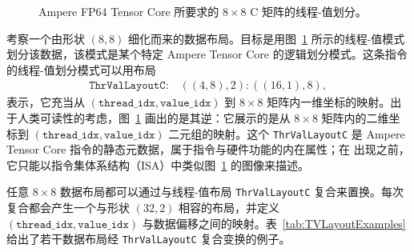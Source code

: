 \begin{figure}[ht]
{
}
\caption{Ampere FP64 Tensor Core 所要求的 $8 {\times} 8$ C 矩阵的线程-值划分。}
\label{fig:TVLayout}
\end{figure}

考察一个由形状 $(8,8)$ 细化而来的数据布局。目标是用图~\ref{fig:TVLayout} 所示的线程-值模式划分该数据，该模式是某个特定 Ampere Tensor Core 的逻辑划分模式。这条指令的线程-值划分模式可以用布局
\begin{align*}
\texttt{ThrValLayoutC:} \quad ((4,8),2):((16,1),8),
\end{align*}
表示，它充当从 $(\texttt{thread\_idx}, \texttt{value\_idx})$ 到 $8 {\times} 8$ 矩阵内一维坐标的映射。出于人类可读性的考虑，图~\ref{fig:TVLayout} 画出的是其逆：它展示的是从 $8 {\times} 8$ 矩阵内的二维坐标到 $(\texttt{thread\_idx}, \texttt{value\_idx})$ 二元组的映射。这个 {\tt ThrValLayoutC} 是 Ampere Tensor Core 指令的静态元数据，属于指令与硬件功能的内在属性；在 \CuTe 出现之前，它只能以指令集体系结构（ISA）中类似图~\ref{fig:TVLayout} 的图像来描述。

任意 $8 {\times} 8$ 数据布局都可以通过与线程-值布局 {\tt ThrValLayoutC} 复合来置换。每次复合都会产生一个与形状 $(32,2)$ 相容的布局，并定义 $(\texttt{thread\_idx}, \texttt{value\_idx})$ 与数据偏移之间的映射。表~\ref{tab:TVLayoutExamples} 给出了若干数据布局经 {\tt ThrValLayoutC} 复合变换的例子。

